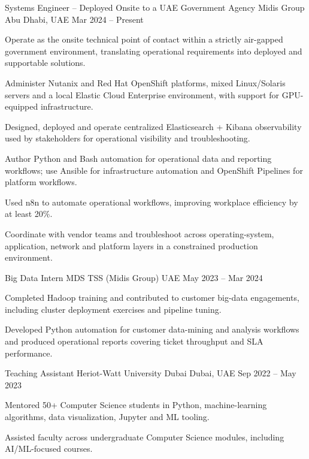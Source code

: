 \documentclass[11pt, a4paper]{awesome-cv}
\begin{document}
\begin{cventries}

  \cventry
    {Systems Engineer -- Deployed Onsite to a UAE Government Agency}
    {Midis Group}
    {Abu Dhabi, UAE}
    {Mar 2024 -- Present}
    {
      \begin{cvitems}
        \item {Operate as the onsite technical point of contact within a strictly air-gapped government environment, translating operational requirements into deployed and supportable solutions.}
        \item {Administer Nutanix and Red Hat OpenShift platforms, mixed Linux/Solaris servers and a local Elastic Cloud Enterprise environment, with support for GPU-equipped infrastructure.}
        \item {Designed, deployed and operate centralized Elasticsearch + Kibana observability used by stakeholders for operational visibility and troubleshooting.}
        \item {Author Python and Bash automation for operational data and reporting workflows; use Ansible for infrastructure automation and OpenShift Pipelines for platform workflows.}
        \item {Used n8n to automate operational workflows, improving workplace efficiency by at least 20\%.}
        \item {Coordinate with vendor teams and troubleshoot across operating-system, application, network and platform layers in a constrained production environment.}
      \end{cvitems}
    }

  \cventry
    {Big Data Intern}
    {MDS TSS (Midis Group)}
    {UAE}
    {May 2023 -- Mar 2024}
    {
      \begin{cvitems}
        \item {Completed Hadoop training and contributed to customer big-data engagements, including cluster deployment exercises and pipeline tuning.}
        \item {Developed Python automation for customer data-mining and analysis workflows and produced operational reports covering ticket throughput and SLA performance.}
      \end{cvitems}
    }

  \cventry
    {Teaching Assistant}
    {Heriot-Watt University Dubai}
    {Dubai, UAE}
    {Sep 2022 -- May 2023}
    {
      \begin{cvitems}
        \item {Mentored 50+ Computer Science students in Python, machine-learning algorithms, data visualization, Jupyter and ML tooling.}
        \item {Assisted faculty across undergraduate Computer Science modules, including AI/ML-focused courses.}
      \end{cvitems}
    }

\end{cventries}
\end{document}
